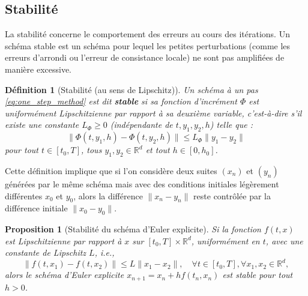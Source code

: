 \documentclass{article}
\newtheorem{proposition}[theorem]{Proposition}
\newtheorem{definition}{Définition}
\begin{document}
\subsection{Stabilité}

La stabilité concerne le comportement des erreurs au cours des itérations. Un schéma stable est un schéma pour lequel les petites perturbations (comme les erreurs d'arrondi ou l'erreur de consistance locale) ne sont pas amplifiées de manière excessive.

\begin{definition}[Stabilité (au sens de Lipschitz)]
\label{def:stability}
Un schéma à un pas \eqref{eq:one_step_method} est dit \textbf{stable} si sa fonction d'incrément $\Phi$ est uniformément Lipschitzienne par rapport à sa deuxième variable, c'est-à-dire s'il existe une constante $L_\Phi \ge 0$ (indépendante de $t, y_1, y_2, h$) telle que :
\begin{equation*}
 \|\Phi(t, y_1, h) - \Phi(t, y_2, h)\| \le L_\Phi \|y_1 - y_2\|
\end{equation*}
pour tout $t \in [t_0, T]$, tous $y_1, y_2 \in \mathbb{R}^d$ et tout $h \in [0, h_0]$.
\end{definition}

Cette définition implique que si l'on considère deux suites $(x_n)$ et $(y_n)$ générées par le même schéma mais avec des conditions initiales légèrement différentes $x_0$ et $y_0$, alors la différence $\|x_n - y_n\|$ reste contrôlée par la différence initiale $\|x_0 - y_0\|$.

\begin{proposition}[Stabilité du schéma d'Euler explicite]
Si la fonction $f(t, x)$ est Lipschitzienne par rapport à $x$ sur $[t_0, T] \times \mathbb{R}^d$, uniformément en $t$, avec une constante de Lipschitz $L$, i.e.,
\begin{equation*}
 \|f(t, x_1) - f(t, x_2)\| \le L \|x_1 - x_2\|, \quad \forall t \in [t_0, T], \forall x_1, x_2 \in \mathbb{R}^d,
\end{equation*}
alors le schéma d'Euler explicite $x_{n+1} = x_n + h f(t_n, x_n)$ est stable pour tout $h > 0$.
\end{proposition}
\end{document}
